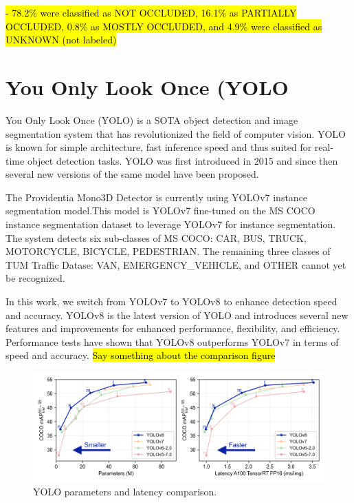 \hl{
- 78.2\% were classified as NOT OCCLUDED, 16.1\% as PARTIALLY OCCLUDED, 0.8\% as MOSTLY OCCLUDED, and 4.9\% were classified as UNKNOWN (not labeled)
}


\section{You Only Look Once (YOLO}

You Only Look Once (YOLO) is a SOTA object detection and image segmentation system that has revolutionized the field of computer vision. YOLO is known for simple architecture, fast inference speed and thus suited for real-time object detection tasks. YOLO was first introduced in 2015 \cite{yolo} and since then several new versions of the same model have been proposed. 

The Providentia Mono3D Detector is currently using YOLOv7 instance segmentation model.This model is YOLOv7 \cite{yolov7} fine-tuned on the MS COCO \cite{lin2014microsoft} instance segmentation dataset to leverage YOLOv7 for instance segmentation. The system detects six sub-classes of MS COCO: CAR, BUS, TRUCK, MOTORCYCLE, BICYCLE, PEDESTRIAN. The remaining three classes of TUM Traffic Datase: VAN, EMERGENCY\_VEHICLE, and OTHER  cannot yet be recognized. 

In this work, we switch from YOLOv7 to YOLOv8 to enhance detection speed and accuracy. YOLOv8 is the latest version of YOLO and introduces several new features and improvements  for enhanced performance, flexibility, and efficiency. Performance tests have shown that YOLOv8 outperforms YOLOv7 in terms of speed and accuracy. \hl{Say something about the comparison figure}


\begin{figure}[htb]%
	\centering%
	\includegraphics[width=150mm]{figures/yolo-comparison-plots.png}%
	\caption{YOLO parameters and latency comparison.}%
	\label{YOLO comparison}%
\end{figure}%

